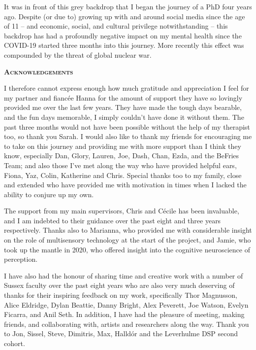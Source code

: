 It was in front of this grey backdrop that I began the journey of a PhD four years ago. Despite (or due to) growing up with and around social media since the age of 11 -- and economic, social, and cultural privilege notwithstanding -- this backdrop has had a profoundly negative impact on my mental health since the COVID-19 started three months into this journey. More recently this effect was compounded by the threat of global nuclear war.
\clearpage

\begin{flushleft}
	\Huge \textsc{\textbf{Acknowledgements}}
	
\end{flushleft}

\noindent I therefore cannot express enough how much gratitude and appreciation I feel for my partner and fiancée Hanna for the amount of support they have so lovingly provided me over the last few years. They have made the tough days bearable, and the fun days memorable, I simply couldn't have done it without them. The past three months would not have been possible without the help of my therapist too, so thank you Sarah. I would also like to thank my friends for encouraging me to take on this journey and providing me with more support than I think they know, especially Dan, Glory, Lauren, Joe, Dash, Chan, Ezda, and the BeFries Team; and also those I've met along the way who have provided helpful ears, Fiona, Yaz, Colin, Katherine and Chris. Special thanks too to my family, close and extended who have provided me with motivation in times when I lacked the ability to conjure up my own.

The support from my main supervisors, Chris and C\'ecile has been invaluable, and I am indebted to their guidance over the past eight and three years respectively. Thanks also to Marianna, who provided me with considerable insight on the role of multisensory technology at the start of the project, and Jamie, who took up the mantle in 2020, who offered insight into the cognitive neuroscience of perception.

I have also had the honour of sharing time and creative work with a number of Sussex faculty over the past eight years who are also very much deserving of thanks for their inspiring feedback on my work, specifically Thor Magnusson, Alice Eldridge, Dylan Beattie, Danny Bright, Alex Peverett, Joe Watson, Evelyn Ficarra, and Anil Seth. In addition, I have had the pleasure of meeting, making friends, and collaborating with, artists and researchers along the way. Thank you to Jon, Sissel, Steve, Dimitris, Max, Halld\'or and the Leverhulme DSP second cohort.

